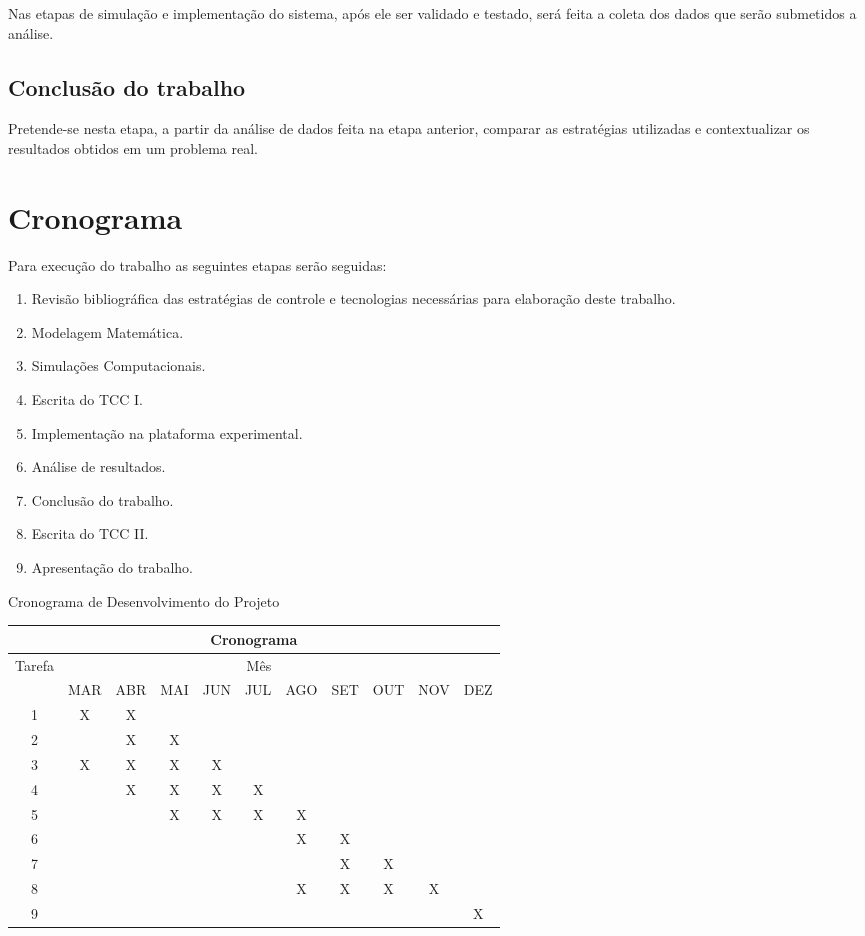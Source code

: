 Nas etapas de simulação e implementação do sistema, após ele ser validado e testado, será feita a coleta dos dados que serão submetidos a análise.

\section{Conclusão do trabalho}

Pretende-se nesta etapa, a partir da análise de dados feita na etapa anterior, comparar as estratégias utilizadas e contextualizar os resultados obtidos em um problema real.

\chapter{Cronograma}

Para execução do trabalho as seguintes etapas serão seguidas:

\begin{enumerate}
	\item Revisão bibliográfica das estratégias de controle e tecnologias 
	necessárias para elaboração deste trabalho.
	\item Modelagem Matemática.
	\item Simulações Computacionais.
	\item Escrita do TCC I.
	\item Implementação na plataforma experimental.
	\item Análise de resultados.
	\item Conclusão do trabalho.
	\item Escrita do TCC II.
	\item Apresentação do trabalho.
\end{enumerate}

\begin{quadro}[!htb]
	\centering
	\caption{Cronograma de Desenvolvimento do Projeto\label{qua:cronograma}}
	\begin{tabular}{|c|cccccccccc|}
		\hline
		\multicolumn{11}{|c|}{\textbf{Cronograma}} \\
		\hline
		\multirow{2}{*}{Tarefa} & \multicolumn{9}{c|}{Mês} \\ \cline{2-10}
		& MAR & ABR & MAI & JUN & JUL & AGO & SET & OUT & NOV & DEZ \\
		\hline
		1 & X & X &&&&&&&& \\
		2 & & X & X &&&&&&& \\
		3 & X & X & X & X &&&&&& \\
		4 & & X & X & X & X &&&&& \\
		5 & & & X & X & X & X &&&& \\
		6 & & & & & & X & X &&& \\
		7 & & & & & & & X & X && \\
		8 & & & & & & X & X & X & X & \\
		9 &&&&&&&&&& X \\
		\hline
	\end{tabular}
\end{quadro}

